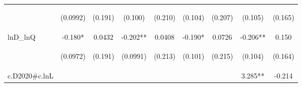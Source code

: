 \documentclass[]{article}
\begin{document}
\begin{center}
\begin{tabular}{lcccccccc}
\vspace{4pt} & \begin{footnotesize}(0.0992)\end{footnotesize} & \begin{footnotesize}(0.191)\end{footnotesize} & \begin{footnotesize}(0.100)\end{footnotesize} & \begin{footnotesize}(0.210)\end{footnotesize} & \begin{footnotesize}(0.104)\end{footnotesize} & \begin{footnotesize}(0.207)\end{footnotesize} & \begin{footnotesize}(0.105)\end{footnotesize} & \begin{footnotesize}(0.165)\end{footnotesize} \\
lnD\_lnQ & -0.180* & 0.0432 & -0.202** & 0.0408 & -0.190* & 0.0726 & -0.206** & 0.150 \\
\vspace{4pt} & \begin{footnotesize}(0.0972)\end{footnotesize} & \begin{footnotesize}(0.191)\end{footnotesize} & \begin{footnotesize}(0.0991)\end{footnotesize} & \begin{footnotesize}(0.213)\end{footnotesize} & \begin{footnotesize}(0.101)\end{footnotesize} & \begin{footnotesize}(0.215)\end{footnotesize} & \begin{footnotesize}(0.104)\end{footnotesize} & \begin{footnotesize}(0.164)\end{footnotesize} \\
c.D2020\#c.lnL &  &  &  &  &  &  & 3.285** & -0.214 \\

\end{tabular}
\end{center}
\end{document}
